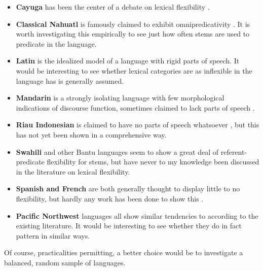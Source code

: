 \begin{itemize}

  \singlespacing

  \item \textbf{Cayuga} has been the center of a debate on lexical flexibility \parencites{Sasse1988}{Sasse1993}{Mithun2000}.

  \item \textbf{Classical Nahuatl} is famously claimed to exhibit omnipredicativity \parencites{Launey1994}{Launey2004}. It is worth investigating this empirically to see just how often stems are used to predicate in the language.

  \item \textbf{Latin} is the idealized model of a language with rigid parts of speech. It would be interesting to see whether lexical categories are as inflexible in the language has is generally assumed.

  \item \textbf{Mandarin} is a strongly isolating language with few morphological indications of discourse function, sometimes claimed to lack parts of speech \parencites{McDonald2013}{Sun2020}.

  \item \textbf{Riau Indonesian} is claimed to have no parts of speech whatsoever \parencite{Gil1994}, but this has not yet been shown in a comprehensive way.

  \item \textbf{Swahili} and other Bantu languages seem to show a great deal of referent-predicate flexibility for stems, but have never to my knowledge been discussed in the literature on lexical flexibility.

  \item \textbf{Spanish and French} are both generally thought to display little to no flexibility, but hardly any work has been done to show this .

  \item \textbf{Pacific Northwest} languages all show similar tendencies to  according to the existing literature. It would be interesting to see whether they do in fact pattern in similar ways.

\end{itemize}

\noindent Of course, practicalities permitting, a better choice would be to investigate a balanced, random sample of languages.

